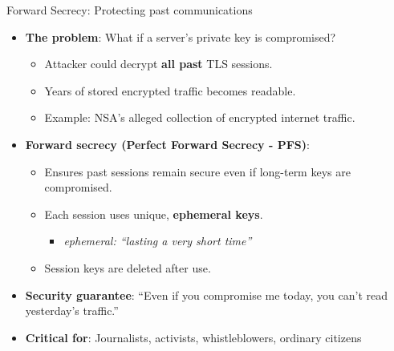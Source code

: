 \documentclass[aspectratio=169, lualatex, handout]{beamer}
\begin{document}
\begin{frame}{Forward Secrecy: Protecting past communications}
	\begin{itemize}[<+->]
		\item \textbf{The problem}: What if a server's private key is compromised?
		      \begin{itemize}
			      \item Attacker could decrypt \textbf{all past} TLS sessions.
			      \item Years of stored encrypted traffic becomes readable.
			      \item Example: NSA's alleged collection of encrypted internet traffic.
		      \end{itemize}
		\item \textbf{Forward secrecy (Perfect Forward Secrecy - PFS)}:
		      \begin{itemize}
			      \item Ensures past sessions remain secure even if long-term keys are compromised.
			      \item Each session uses unique, \textbf{ephemeral keys}.
			            \begin{itemize}
				            \item \textit{ephemeral: ``lasting a very short time''}
			            \end{itemize}
			      \item Session keys are deleted after use.
		      \end{itemize}
		\item \textbf{Security guarantee}: ``Even if you compromise me today, you can't read yesterday's traffic.''
		\item \textbf{Critical for}: Journalists, activists, whistleblowers, ordinary citizens
	\end{itemize}
\end{frame}
\end{document}
